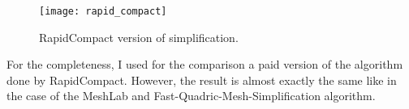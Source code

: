 \begin{figure}[H]
  \begin{center}
    \texttt{[image: rapid\_compact]}
    \caption{RapidCompact version of simplification.}
    \label{fig:rapid_compact}
  \end{center}
\end{figure}

For the completeness, I used for the comparison a paid version of the algorithm done by RapidCompact. However, the result is almost exactly the same like in the case of the MeshLab and Fast-Quadric-Mesh-Simplification algorithm.
